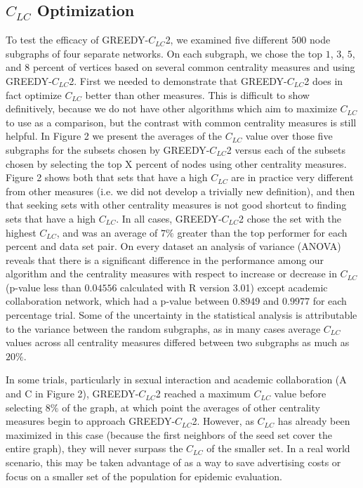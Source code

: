 \subsection*{$C_{LC}$ Optimization}
To test the efficacy of GREEDY-$C_{LC}$2, we examined five different $500$ node subgraphs of four separate networks.  On each subgraph, we chose the top $1$, $3$, $5$, and $8$ percent of vertices based on several common centrality measures and using GREEDY-$C_{LC}$2.  First we needed to demonstrate that GREEDY-$C_{LC}$2 does in fact optimize $C_{LC}$ better than other measures.  This is difficult to show definitively, because we do not have other algorithms which aim to maximize $C_{LC}$ to use as a comparison, but the contrast with common centrality measures is still helpful.  In Figure 2 we present the averages of the $C_{LC}$ value over those five subgraphs for the subsets chosen by GREEDY-$C_{LC}$2 versus each of the subsets chosen by selecting the top X percent of nodes using other centrality measures.  Figure 2 shows both that sets that have a high $C_{LC}$ are in practice very different from other measures (i.e. we did not develop a trivially new definition), and then that seeking sets with other centrality measures is not good shortcut to finding sets that have a high $C_{LC}$.  In all cases, GREEDY-$C_{LC}$2 chose the set with the highest $C_{LC}$, and was an average of $7\%$ greater than the top performer for each percent and data set pair.  On every dataset an analysis of variance (ANOVA) reveals that there is a significant difference in the performance among our algorithm and the centrality measures with respect to increase or decrease in $C_{LC}$ (p-value less than $0.04556$ calculated with R version 3.01) except academic collaboration network, which had a p-value between $0.8949$ and $0.9977$ for each percentage trial.  Some of the uncertainty in the statistical analysis is attributable to the variance between the random subgraphs, as in many cases average $C_{LC}$ values across all centrality measures differed between two subgraphs as much as $20\%$.

In some trials, particularly in sexual interaction and academic collaboration (A and C in Figure 2), GREEDY-$C_{LC}$2 reached a maximum $C_{LC}$ value before selecting $8\%$ of the graph, at which point the averages of other centrality measures begin to approach GREEDY-$C_{LC}$2.  However, as $C_{LC}$ has already been maximized in this case (because the first neighbors of the seed set cover the entire graph), they will never surpass the $C_{LC}$ of the smaller set.  In a real world scenario, this may be taken advantage of as a way to save advertising costs or focus on a smaller set of the population for epidemic evaluation.

